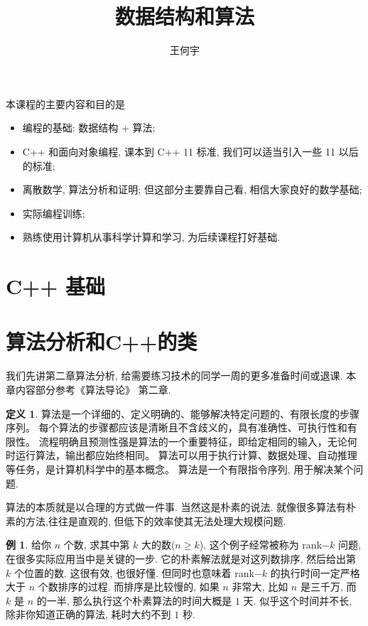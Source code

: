 \documentclass[a4paper]{ctexart}
\title{数据结构和算法}
\author{王何宇}
\date{}
\theoremstyle{definition}
\newtheorem{definition}{定义}[section]
\theoremstyle{definition}
\newtheorem{example}{例}[section]
\begin{document}
\maketitle
\pagestyle{empty}

本课程的主要内容和目的是
\begin{itemize}
\item 编程的基础: 数据结构 + 算法;
\item C++ 和面向对象编程, 课本到 C++ 11 标准, 我们可以适当引入一些 11 以后的标准;
\item 离散数学, 算法分析和证明; 但这部分主要靠自己看, 相信大家良好的数学基础; 
\item 实际编程训练;
\item 熟练使用计算机从事科学计算和学习, 为后续课程打好基础.
\end{itemize}

\section{C++ 基础}

\section{算法分析和C++的类}
我们先讲第二章算法分析, 给需要练习技术的同学一周的更多准备时间或退课. 本章内容部分参考《算法导论》\cite{cormen2022introduction} 第二章.

\begin{definition}
  算法是一个详细的、定义明确的、能够解决特定问题的、有限长度的步骤序列。
  每个算法的步骤都应该是清晰且不含歧义的，具有准确性、可执行性和有限性。 
  流程明确且预测性强是算法的一个重要特征，即给定相同的输入，无论何时运行算法，输出都应始终相同。 
  算法可以用于执行计算、数据处理、自动推理等任务，是计算机科学中的基本概念。  算法是一个有限指令序列, 用于解决某个问题.
\end{definition}
  
算法的本质就是以合理的方式做一件事. 当然这是朴素的说法.
就像很多算法有朴素的方法,往往是直观的,
但低下的效率使其无法处理大规模问题.

\begin{example}
给你 $n$ 个数, 求其中第 $k$ 大的数($n \geq k$).
这个例子经常被称为 rank$-k$ 问题,在很多实际应用当中是关键的一步.
它的朴素解法就是对这列数排序, 然后给出第 $k$ 个位置的数. 这很有效,
也很好懂. 但同时也意味着 rank$-k$ 的执行时间一定严格大于 $n$ 个数排序的过程.
而排序是比较慢的, 如果 $n$ 非常大, 比如 $n$ 是三千万, 而 $k$ 是 $n$ 的一半,
那么执行这个朴素算法的时间大概是 $1$ 天. 似乎这个时间并不长, 除非你知道正确的算法,
耗时大约不到 $1$ 秒.
\end{example}
\end{document}
